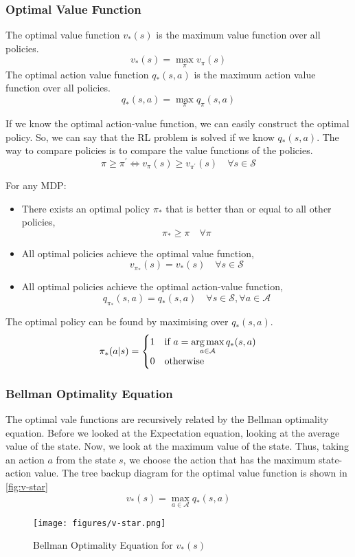 \subsubsection{Optimal Value Function}
\begin{definition}
    The optimal value function \(v_{*} (s)\) is the maximum value function over all policies.
    \[
        v_{*} (s) = \max_{\pi} v_{\pi} (s)  
    \]
    The optimal action value function \(q_{*} (s, a)\) is the maximum
    action value function over all policies.
    \[
        q_{*} (s, a) = \max_{\pi} q_{\pi} (s, a)
    \]
\end{definition}
If we know the optimal action-value function, we can easily construct the optimal policy. 
So, we can say that the RL problem is solved if we know \(q_{*} (s, a)\). The way to compare
policies is to compare the value functions of the policies.
\[
    \pi \geq \pi^{\prime} \iff v_{\pi} (s) \geq v_{\pi^{\prime}} (s) \quad \forall s \in \mathcal{S}  
\]
\begin{theorem}
    For any MDP:
    \begin{itemize}
        \item There exists an optimal policy \(\pi_{*} \) that is better than or equal to all other policies,
        \[
            \pi_{*} \geq \pi \quad \forall \pi  
        \]
        \item All optimal policies achieve the optimal value function,
        \[
            v_{\pi_{*}} (s) = v_{*} (s) \quad \forall s \in \mathcal{S}  
        \]
        \item All optimal policies achieve the optimal action-value function,
        \[
            q_{\pi_{*}} (s, a) = q_{*} (s, a) \quad \forall s \in \mathcal{S} , \forall a \in \mathcal{A}  
        \]
    \end{itemize}
\end{theorem}
The optimal policy can be found by maximising over \(q_{*} (s, a)\).
\[
    \pi_{*} (a|s) = 
    \begin{cases}
        1 & \text{if } a = \operatorname*{arg\,max}\limits_{a \in \mathcal{A} } q_{*} (s, a) \\
        0 & \text{otherwise} \\
    \end{cases}
\]
\subsubsection{Bellman Optimality Equation}
The optimal vale functions are recursively related by the Bellman
optimality equation.
Before we looked at the Expectation equation, looking at the average
value of the state. Now, we look at the maximum value of the state. 
Thus, taking an action \(a\) from the state \(s\), we choose the action
that has the maximum state-action value. The tree backup diagram for the
optimal value function is shown in \autoref{fig:v-star}
\[
    v_{*} (s) = \max_{a \in \mathcal{A} } q_{*} (s, a)  
\] 
\begin{figure}[H]
    \centering
    \texttt{[image: figures/v-star.png]}
    \caption{Bellman Optimality Equation for \(v_{*} (s)\)}
    \label{fig:v-star}
\end{figure}

